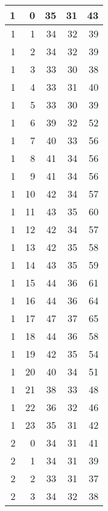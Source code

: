     \begin{longtable}{|r|r|r|r|r|}
		\hline
    1     & 0     & 35    & 31    & 43 \\
    \hline
    1     & 1     & 34    & 32    & 39 \\
    \hline
    1     & 2     & 34    & 32    & 39 \\
    \hline
    1     & 3     & 33    & 30    & 38 \\
    \hline
    1     & 4     & 33    & 31    & 40 \\
    \hline
    1     & 5     & 33    & 30    & 39 \\
    \hline
    1     & 6     & 39    & 32    & 52 \\
    \hline
    1     & 7     & 40    & 33    & 56 \\
    \hline
    1     & 8     & 41    & 34    & 56 \\
    \hline
    1     & 9     & 41    & 34    & 56 \\
    \hline
    1     & 10    & 42    & 34    & 57 \\
    \hline
    1     & 11    & 43    & 35    & 60 \\
    \hline
    1     & 12    & 42    & 34    & 57 \\
    \hline
    1     & 13    & 42    & 35    & 58 \\
    \hline
    1     & 14    & 43    & 35    & 59 \\
    \hline
    1     & 15    & 44    & 36    & 61 \\
    \hline
    1     & 16    & 44    & 36    & 64 \\
    \hline
    1     & 17    & 47    & 37    & 65 \\
    \hline
    1     & 18    & 44    & 36    & 58 \\
    \hline
    1     & 19    & 42    & 35    & 54 \\
    \hline
    1     & 20    & 40    & 34    & 51 \\
    \hline
    1     & 21    & 38    & 33    & 48 \\
    \hline
    1     & 22    & 36    & 32    & 46 \\
    \hline
    1     & 23    & 35    & 31    & 42 \\
    \hline
    2     & 0     & 34    & 31    & 41 \\
    \hline
    2     & 1     & 34    & 31    & 39 \\
    \hline
    2     & 2     & 33    & 31    & 37 \\
    \hline
    2     & 3     & 34    & 32    & 38 \\

\end{longtable}

